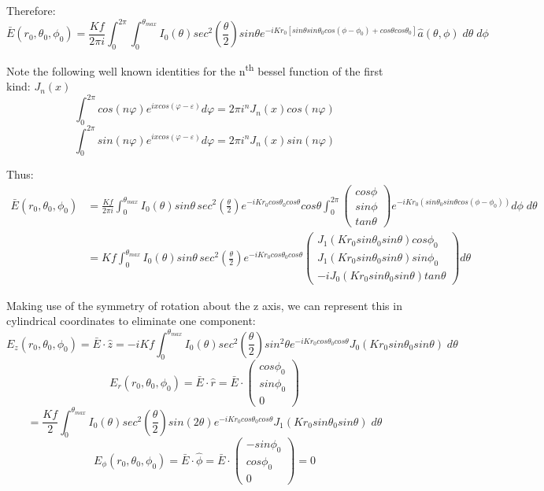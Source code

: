 \documentclass{article}
\begin{document}
    
    Therefore:
    \[\bar{E}(r_0, \theta_0,\phi_0) = \frac{Kf}{2\pi i}\int_0^{2\pi} \int_0^{\theta_{max}}I_0(\theta)sec^2\left(\frac{\theta}{2}\right)sin\theta e^{-iKr_0[sin\theta sin\theta_0 cos(\phi - \phi_0) + cos\theta cos\theta_0]} \hat{a}(\theta,\phi) \; d\theta \; d\phi\]
    
    Note the following well known identities for the n\textsuperscript{th} bessel function of the first kind: \(J_n(x)\)
    \[\int_0^{2\pi} cos(n\varphi)e^{ixcos(\varphi-\varepsilon)}d\varphi = 2\pi i^n J_n(x) cos(n\varphi)\]
    \[\int_0^{2\pi} sin(n\varphi)e^{ixcos(\varphi-\varepsilon)}d\varphi = 2\pi i^n J_n(x) sin(n\varphi)\]
    
    Thus:
    \begin{align*}
        \bar{E}(r_0,\theta_0,\phi_0) &= \frac{Kf}{2\pi i} \int_0^{\theta_{max}} I_0(\theta) sin\theta \, sec^2\left(\frac{\theta}{2}\right)e^{-iKr_0 cos\theta_0 cos\theta} cos\theta \int_0^{2\pi} \begin{pmatrix} cos\phi \\ sin\phi \\ tan\theta \end{pmatrix} e^{-iKr_0(sin\theta_0sin\theta cos(\phi-\phi_0))}d\phi \; d\theta \\ &= Kf \int_0^{\theta_{max}} I_0(\theta) sin\theta \, sec^2\left(\frac{\theta}{2}\right)e^{-iKr_0 cos\theta_0 cos\theta} \begin{pmatrix} J_1(Kr_0sin\theta_0sin\theta)cos\phi_0 \\ J_1(Kr_0sin\theta_0sin\theta)sin\phi_0 \\ -i J_0(Kr_0sin\theta_0sin\theta)tan\theta \end{pmatrix} d\theta
    \end{align*}
    
    Making use of the symmetry of rotation about the z axis, we can represent this in cylindrical coordinates to eliminate one component:
    \[E_z(r_0,\theta_0,\phi_0) = \bar{E} \cdot \hat{z} = -iKf \int_0^{\theta_{max}} I_0(\theta)sec^2\left(\frac{\theta}{2}\right) sin^2\theta e^{-iKr_0 cos\theta_0 cos\theta} J_0(Kr_0sin\theta_0sin\theta) \; d\theta\]
    \[E_r(r_0,\theta_0,\phi_0) = \bar{E} \cdot \hat{r} = \bar{E} \cdot \begin{pmatrix} cos\phi_0 \\ sin\phi_0 \\ 0 \end{pmatrix}\]
    \[= \frac{Kf}{2} \int_0^{\theta_{max}} I_0(\theta) sec^2\left(\frac{\theta}{2}\right) sin(2\theta) e^{-iKr_0 cos\theta_0 cos\theta} J_1(Kr_0sin\theta_0 sin\theta) \; d\theta\]
    \[E_{\phi}(r_0,\theta_0,\phi_0) = \bar{E} \cdot \hat{\phi} = \bar{E} \cdot \begin{pmatrix} -sin\phi_0 \\ cos\phi_0 \\ 0 \end{pmatrix} = 0 \]
    
\end{document}
